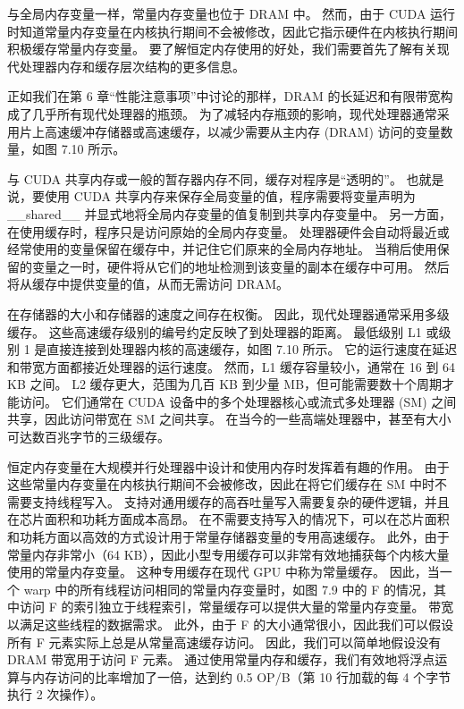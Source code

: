 与全局内存变量一样，常量内存变量也位于 DRAM 中。 然而，由于 CUDA 运行时知道常量内存变量在内核执行期间不会被修改，因此它指示硬件在内核执行期间积极缓存常量内存变量。 要了解恒定内存使用的好处，我们需要首先了解有关现代处理器内存和缓存层次结构的更多信息。

正如我们在第 6 章“性能注意事项”中讨论的那样，DRAM 的长延迟和有限带宽构成了几乎所有现代处理器的瓶颈。 为了减轻内存瓶颈的影响，现代处理器通常采用片上高速缓冲存储器或高速缓存，以减少需要从主内存 (DRAM) 访问的变量数量，如图 7.10 所示。

与 CUDA 共享内存或一般的暂存器内存不同，缓存对程序是“透明的”。 也就是说，要使用 CUDA 共享内存来保存全局变量的值，程序需要将变量声明为 \_\_shared\_\_ 并显式地将全局内存变量的值复制到共享内存变量中。 另一方面，在使用缓存时，程序只是访问原始的全局内存变量。 处理器硬件会自动将最近或经常使用的变量保留在缓存中，并记住它们原来的全局内存地址。 当稍后使用保留的变量之一时，硬件将从它们的地址检测到该变量的副本在缓存中可用。 然后将从缓存中提供变量的值，从而无需访问 DRAM。

在存储器的大小和存储器的速度之间存在权衡。 因此，现代处理器通常采用多级缓存。 这些高速缓存级别的编号约定反映了到处理器的距离。 最低级别 L1 或级别 1 是直接连接到处理器内核的高速缓存，如图 7.10 所示。 它的运行速度在延迟和带宽方面都接近处理器的运行速度。 然而，L1 缓存容量较小，通常在 16 到 64 KB 之间。 L2 缓存更大，范围为几百 KB 到少量 MB，但可能需要数十个周期才能访问。 它们通常在 CUDA 设备中的多个处理器核心或流式多处理器 (SM) 之间共享，因此访问带宽在 SM 之间共享。 在当今的一些高端处理器中，甚至有大小可达数百兆字节的三级缓存。

恒定内存变量在大规模并行处理器中设计和使用内存时发挥着有趣的作用。 由于这些常量内存变量在内核执行期间不会被修改，因此在将它们缓存在 SM 中时不需要支持线程写入。 支持对通用缓存的高吞吐量写入需要复杂的硬件逻辑，并且在芯片面积和功耗方面成本高昂。 在不需要支持写入的情况下，可以在芯片面积和功耗方面以高效的方式设计用于常量存储器变量的专用高速缓存。 此外，由于常量内存非常小（64 KB），因此小型专用缓存可以非常有效地捕获每个内核大量使用的常量内存变量。 这种专用缓存在现代 GPU 中称为常量缓存。 因此，当一个 warp 中的所有线程访问相同的常量内存变量时，如图 7.9 中的 F 的情况，其中访问 F 的索引独立于线程索引，常量缓存可以提供大量的常量内存变量。 带宽以满足这些线程的数据需求。 此外，由于 F 的大小通常很小，因此我们可以假设所有 F 元素实际上总是从常量高速缓存访问。 因此，我们可以简单地假设没有 DRAM 带宽用于访问 F 元素。 通过使用常量内存和缓存，我们有效地将浮点运算与内存访问的比率增加了一倍，达到约 0.5 OP/B（第 10 行加载的每 4 个字节执行 2 次操作）。

